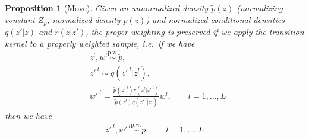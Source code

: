 \documentclass[anonymous=false, %
               format=acmsmall, %
               review=true, %
               screen=true, %
               nonacm=true]{acmart}
\newtheorem{proposition}{Proposition}
\theoremstyle{definition}
\newcommand{\given}{\lvert}
\newcommand{\pw}{\overset{\text{p.w.}}{\sim}
}
\begin{document}
\begin{proposition}[Move]
\label{proposition:extendedspace}
    Given an unnormalized density $\tilde p(z)$ (normalizing constant $Z_p$, normalized density $p(z)$) and normalized conditional densities $q(z' \given z)$ and $r(z \given z')$, the proper weighting is preserved if we apply the transition kernel to a properly weighted sample, i.e.~if we have
    \begin{align}
        &
        z^l, w^l \pw \tilde p, \label{eq:pw-of-p}\\[1em]
        &
         z'^{\:l} \sim q(z'^{\:l} \given z^l),  \label{eq:z-prime}\\[1em]
        &
        w'^{\:l} = \frac{\tilde p(z'^{\:l})r(z^l \given z'^{\:l})}{\tilde p(z^l)q(z'^{\:l} \given z^l)} w^l, \qquad l = 1, \ldots, L \label{eq:w-prime}
    \end{align}
then we have
    \begin{align}
        z'^{\:l}, w'^{\:l} \pw \tilde p, \qquad  l = 1, \ldots, L \label{eq:to-prove}
    \end{align}
\end{proposition}
\end{document}
